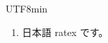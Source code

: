 \documentclass{article}
\begin{document}
\begin{CJK}{UTF8}{min}
\begin{enumerate}
  \item 日本語 ratex です。
\end{enumerate}
\end{CJK}
\end{document}
